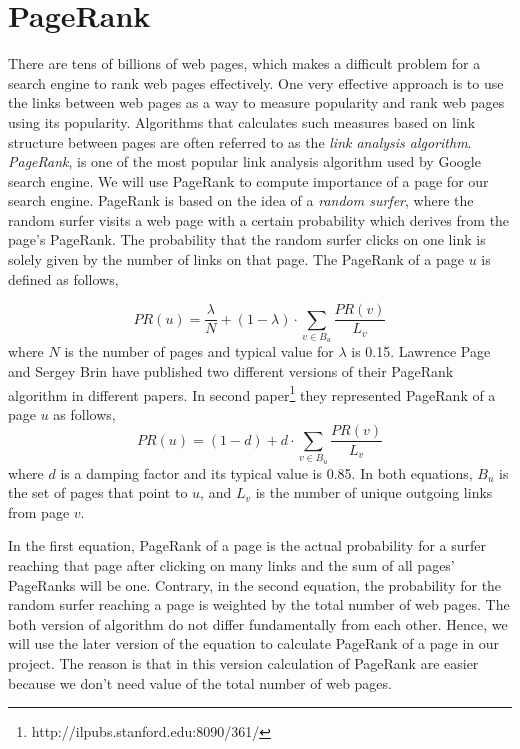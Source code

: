 \documentclass[letterpaper,11pt,twoside]{article}
\begin{document}
\section{PageRank}
There are tens of billions of web pages, which makes a difficult problem for a search engine to rank web pages effectively. One very effective approach is to use the links between web pages as a way to measure popularity and rank web pages using its popularity. Algorithms that calculates such measures based on link structure between pages are often referred to as the \emph{link analysis algorithm}. \emph{PageRank}, is one of the most popular link analysis algorithm used by Google search engine. We will use PageRank to compute importance of a page for our search engine. PageRank is based on the idea of a \emph{random surfer}, where the random surfer visits a web page with a certain probability which derives from the page's PageRank. The probability that the random surfer clicks on one link is solely given by the number of links on that page. The PageRank of a page $u$ is defined as follows,

\begin{equation}
	PR(u) = \frac{\lambda}{N} + (1 - \lambda) \cdot \sum_{v \in B_u} \frac{PR(v)}{L_v}
\end{equation}
where $N$ is the number of pages and typical value for $\lambda$ is 0.15. Lawrence Page and Sergey Brin have published two different versions of their PageRank algorithm in different papers. In second paper\footnote{http://ilpubs.stanford.edu:8090/361/} they represented PageRank of a page $u$ as follows,
\begin{equation}
	PR(u) =  (1 - d) + d \cdot \sum_{v \in B_u} \frac{PR(v)}{L_v}
\end{equation}  
where $d$ is a damping factor and its typical value is 0.85. In both equations, $B_u$ is the set of pages that point to $u$, and $L_v$ is the number of unique outgoing links from page $v$.

In the first equation, PageRank of a page is the actual probability for a surfer reaching that page after clicking on many links and the sum of all pages' PageRanks will be one. Contrary, in the second equation, the probability for the random surfer reaching a page is weighted by the total number of web pages. The both version of algorithm do not differ fundamentally from each other. Hence, we will use the later version of the equation to calculate PageRank of a page in our project. The reason is that in this version calculation of PageRank are easier because we don't need value of the total number of web pages. 
\end{document}
